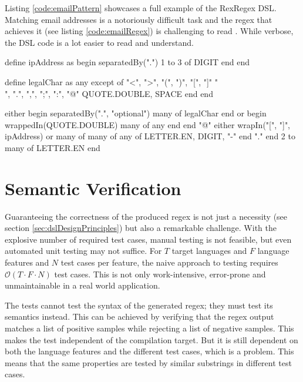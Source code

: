 Listing \ref{code:emailPattern} showcases a full example of the RexRegex DSL. Matching email addresses is a notoriously difficult task and the regex that achieves it (see listing \ref{code:emailRegex}) is challenging to read \cite{EmailRegex}. While verbose, the DSL code is a lot easier to read and understand.

\begin{rexregexBox}[float=htbp,title={RexRegex Code for Validating Email Addresses},breakable,label=code:emailPattern,width=13cm,center,listing options={style=rexregex,basicstyle=\small\ttfamily}]
define ipAddress as
    begin separatedBy(".")
        1 to 3 of DIGIT
    end
end

define legalChar as
    any except of
        "<", ">", "(", ")", "[", "]"
        "\\", ".", ",", ";", ":", "@"
        QUOTE.DOUBLE, SPACE
    end
end

either
    begin separatedBy(".", "optional")
        many of legalChar
    end
or
    begin wrappedIn(QUOTE.DOUBLE)
        many of any
    end
end
"@"
either
    wrapIn("[", "]", ipAddress)
or
    many of
        many of
            any of LETTER.EN, DIGIT, "-"
        end
        "."
    end
    2 to many of LETTER.EN
end
\end{rexregexBox}

{
\hypersetup{citecolor=white}
\begin{listingBox}[float=htb,title={Regex for Validating Email Addresses \cite{EmailRegex}},label=code:emailRegex]
    
\end{listingBox}
}

\section{Semantic Verification} \label{sec:verification}

Guaranteeing the correctness of the produced regex is not just a necessity (see section \ref{sec:dslDesignPrinciples}) but also a remarkable challenge. With the explosive number of required test cases, manual testing is not feasible, but even automated unit testing may not suffice. For $T$ target languages and $F$ language features and $N$ test cases per feature, the naive approach to testing requires $\mathcal{O}(T \cdot F \cdot N)$ test cases. This is not only work-intensive, error-prone and unmaintainable in a real world application. 

The tests cannot test the syntax of the generated regex; they must test its semantics instead. This can be achieved by verifying that the regex output matches a list of positive samples while rejecting a list of negative samples. This makes the test independent of the compilation target. But it is still dependent on both the language features and the different test cases, which is a problem. This means that the same properties are tested by similar substrings in different test cases. 

